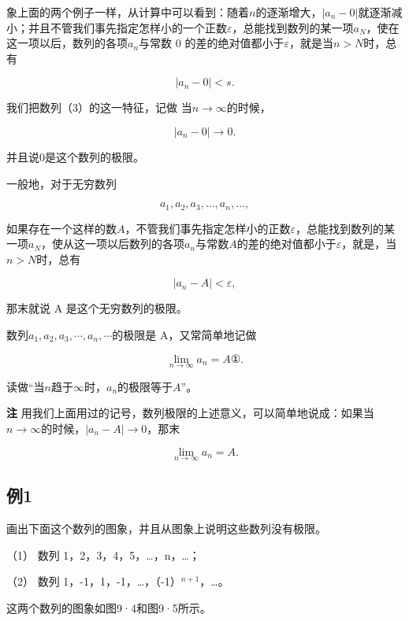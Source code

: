 象上面的两个例子一样，从计算中可以看到：随着\(n\)的逐渐增大，\(\left|a_{n}-0\right|\)就逐渐减小；并且不管我们事先指定怎样小的一个正数\(\varepsilon\)，总能找到数列的某一项\(a_{N}\)，使在这一项以后，数列的各项\(a_{n}\)与常数
0 的差的绝对值都小于\(\varepsilon\)，就是当\(n>N\)时，总有

\[
\left| a_{n} - 0 \right| < s.
\]

我们把数列（3）的这一特征，记做 当\(n \to \infty\)的时候，

\[
\left| a_{n} - 0 \right|\rightarrow 0.
\]

并且说0是这个数列的极限。

一般地，对于无穷数列

\[
a_{1}, a_{2}, a_{3}, \dots, a_{n}, \dots,
\]

如果存在一个这样的数\(A\)，不管我们事先指定怎样小的正数\(\varepsilon\)，总能找到数列的某一项\(a_{N}\)，使从这一项以后数列的各项\(a_{n}\)与常数\(A\)的差的绝对值都小于\(\varepsilon\)，就是，当\(n > N\)时，总有

\[
\left| a_{n} - A \right| < \varepsilon,
\]

那末就说 A 是这个无穷数列的极限。

数列\(a_{1}, a_{2}, a_{3}, \cdots, a_{n}, \cdots\)的极限是
A，又常简单地记做

\[
\lim_{n \rightarrow \infty} a_{n} = A ①.
\]

读做``当\(n\)趋于\(\infty\)时，\(a_{n}\)的极限等于\(A\)''。

\textbf{注}
用我们上面用过的记号，数列极限的上述意义，可以简单地说成：如果当\(n \to \infty\)的时候，\(|a_n - A| \to 0\)，那末

\[
\lim_{n \rightarrow \infty} a_{n} = A.
\]

\subsection{例1}

画出下面这个数列的图象，并且从图象上说明这些数列没有极限。

（1） 数列 1，2，3，4，5，\ldots，n，\ldots；

（2） 数列 1，-1，1，-1，\ldots，（-1）\(^{n+1}\)，\ldots。

 这两个数列的图象如图9·4和图9·5所示。

